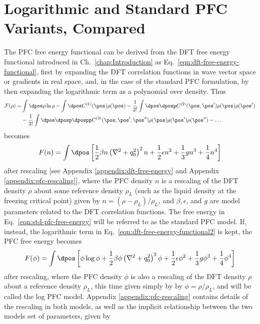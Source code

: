 \section{Logarithmic and Standard PFC Variants, Compared}
\label{chap:Related Work}
The PFC free energy functional can be derived from the DFT free energy functional introduced in Ch.~\ref{chap:Introduction} as Eq.~\ref{eqn:dft-free-energy-functional}, first by expanding the DFT correlation functions in wave vector space or gradients in real space, and, in the case of the standard PFC formulation, by then expanding the logarithmic term as a polynomial over density.  Thus
%
\begin{align}\label{eqn:dft-free-energy-functional2}
\mathcal{F}(\rho) = &\int \dpos \rho \ln{\rho} - \int \dpos C^{(1)}(\pos) \rho(\pos) - \frac{1}{2!} \int \dpos \dposp C^{(2)}(\pos, \pos') \rho(\pos) \rho(\pos') \\
    &- \frac{1}{3!} \int \dpos \dposp \dpospp C^{(3)}(\pos, \pos', \pos'') \rho(\pos) \rho(\pos') \rho(\pos'') - \ldots \nonumber
\end{align}
%
becomes
%
\begin{align}\label{eqn:std-pfc-free-energy}
    F(n) = \int \dpos \left[ \frac{1}{2} \beta n \left( \nabla^2 + q_0^2 \right)^2 n + \frac{1}{2} \epsilon n^2 + \frac{1}{3}g n^3 + \frac{1}{4} n^4 \right]
\end{align}
%
after rescaling [see Appendix \ref{appendix:dft-free-energy} and Appendix \ref{appendix:pfc-rescaling}], where the PFC density $n$ is a rescaling of the DFT density $\rho$ about some reference density $\rho_L$ (such as the liquid density at the freezing critical point) given by $n = (\rho - \rho_L)/\rho_L$, and $\beta, \epsilon$, and $g$ are model parameters related to the DFT correlation functions.  The free energy in Eq.~\ref{eqn:std-pfc-free-energy} will be referred to as the standard PFC model.  If, instead, the logarithmic term in Eq.~\ref{eqn:dft-free-energy-functional2} is kept, the PFC free energy becomes
%
\begin{align}\label{eqn:log-pfc-free-energy}
    F(\phi) = \int \dpos \left[ \phi \log \phi + \frac{1}{2} \beta \phi \left( \nabla^2 + q_0^2 \right)^2 \phi + \frac{1}{2} \epsilon \phi^2 + \frac{1}{3}g \phi^3 + \frac{1}{4} \phi^4 \right]
\end{align}
%
after rescaling, where the PFC density $\phi$ is also a rescaling of the DFT density $\rho$ about a reference density $\rho_L$, this time given simply by by $\phi = \rho/\rho_L$, and will be called the log PFC model.  Appendix \ref{appendix:pfc-rescaling} contains details of the rescaling in both models, as well as the implicit relationship between the two models set of parameters, given by

